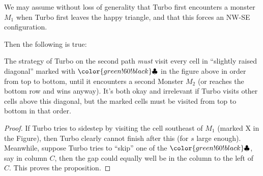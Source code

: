 We may assume without loss of generality that Turbo first encounters a monster $M_1$
when Turbo first leaves the happy triangle, and that this forces an NW-SE configuration.

\begin{center}
\end{center}

Then the following is true:
\begin{proposition*}
  The strategy of Turbo on the second path \emph{must}
  visit every cell in ``slightly raised diagonal'' marked with
  $\color{green!60!black}\clubsuit$ in the figure above
  in order from top to bottom, until it encounters a second Monster $M_2$
  (or reaches the bottom row and wins anyway).
  It's both okay and irrelevant if Turbo visits other cells above this diagonal,
  but the marked cells must be visited from top to bottom in that order.
\end{proposition*}
\begin{proof}
  If Turbo tries to sidestep by visiting the cell southeast of $M_1$
  (marked {\color{brown}X} in the Figure),
  then Turbo clearly cannot finish after this (for $s$ large enough).
  Meanwhile, suppose Turbo tries to ``skip'' one of the $\color{green!60!black}\clubsuit$,
  say in column $C$, then the gap could equally well be in the column to the left of $C$.
  This proves the proposition.
\end{proof}

